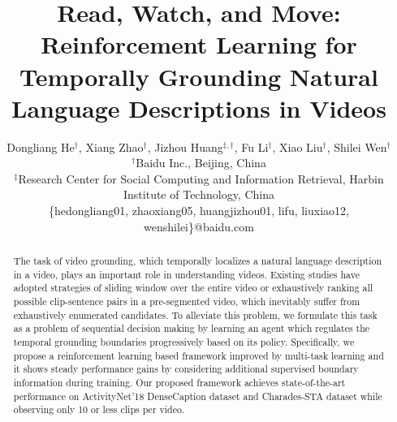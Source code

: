 \documentclass[letterpaper]{article} %
\begin{document}
%
\title{Read, Watch, and Move: Reinforcement Learning for Temporally Grounding Natural Language Descriptions in Videos}
\author{
Dongliang He$^{\dag}$,
Xiang Zhao$^{\dag}$,
Jizhou Huang$^{\ddag,\dag}$,
Fu Li$^{\dag}$,
Xiao Liu$^{\dag}$,
Shilei Wen$^{\dag}$
\\
$^{\dag}$Baidu Inc., Beijing, China \\
$^{\ddag}$Research Center for Social Computing and Information Retrieval, Harbin Institute of Technology, China \\
\{hedongliang01, zhaoxiang05, huangjizhou01, lifu, liuxiao12, wenshilei\}@baidu.com
}

\maketitle
\begin{abstract}
The task of video grounding, which temporally localizes a natural language description in a video, plays an important role in understanding videos.
Existing studies have adopted strategies of sliding window over the entire video or exhaustively ranking all possible clip-sentence pairs in a pre-segmented video, which inevitably suffer from exhaustively enumerated candidates.
To alleviate this problem, we formulate this task as a problem of sequential decision making by learning an agent which regulates the temporal grounding boundaries progressively based on its policy.
Specifically, we propose a reinforcement learning based framework improved by multi-task learning and it shows steady performance gains by considering additional supervised boundary information during training.
Our proposed framework achieves state-of-the-art performance on ActivityNet'18 DenseCaption dataset \cite{densecaption} and Charades-STA dataset \cite{charades,tall} while observing only 10 or less clips per video.
\end{abstract}
\end{document}
